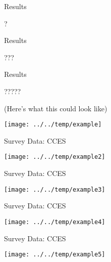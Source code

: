 \documentclass[
  ignorenonframetext,
  aspectratio=169]{beamer}
\begin{document}
\begin{frame}{Results}
\protect\hypertarget{results}{}
\begin{center}
?
\end{center}
\end{frame}

\begin{frame}{Results}
\protect\hypertarget{results-1}{}
\begin{center}
???
\end{center}
\end{frame}

\begin{frame}{Results}
\protect\hypertarget{results-2}{}
\begin{center}
?????
\end{center}
\end{frame}

\begin{frame}{(Here's what this could look like)}
\protect\hypertarget{heres-what-this-could-look-like}{}
\begin{center}\texttt{[image: ../../temp/example]} \end{center}
\end{frame}

\begin{frame}{Survey Data: CCES}
\protect\hypertarget{survey-data-cces}{}
\begin{center}\texttt{[image: ../../temp/example2]} \end{center}
\end{frame}

\begin{frame}{Survey Data: CCES}
\protect\hypertarget{survey-data-cces-1}{}
\begin{center}\texttt{[image: ../../temp/example3]} \end{center}
\end{frame}

\begin{frame}{Survey Data: CCES}
\protect\hypertarget{survey-data-cces-2}{}
\begin{center}\texttt{[image: ../../temp/example4]} \end{center}
\end{frame}

\begin{frame}{Survey Data: CCES}
\protect\hypertarget{survey-data-cces-3}{}
\begin{center}\texttt{[image: ../../temp/example5]} \end{center}
\end{frame}
\end{document}
